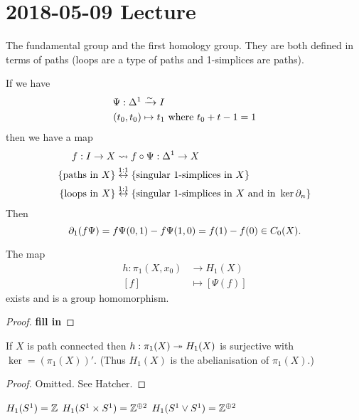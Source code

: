 \section{2018-05-09 Lecture}

The fundamental group and the first homology group.
They are both defined in terms of paths (loops are a type of paths and 1-simplices are paths).

If we have
\begin{align*}
  \Psi: \Delta^1 &\xrightarrow{\sim} I \\
  (t_0,t_0) &\mapsto t_1 \text{ where } t_0+t-1=1
\end{align*}
then we have a map
\begin{align*}
  f: I \to X &\leadsto f \circ \Psi: \Delta^1 \to X \\
  \{ \text{paths in } X\} &\overset{1:1}{\leftrightarrow} \{\text{singular 1-simplices in } X\} \\
  \{ \text{loops in } X\} &\overset{1:1}{\leftrightarrow} \{\text{singular 1-simplices in } X \text{ and in } \ker \partial_n \}
\end{align*}
Then
\[ \partial_1(f\Psi) = f\Psi(0,1) - f\Psi(1,0) = f(1)-f(0) \in C_0(X). \]

\begin{lem}
  The map
  \begin{align*}
    h: \pi_1(X,x_0) &\to H_1(X) \\
    [f] &\mapsto [\Psi(f)]
  \end{align*}
  exists and is a group homomorphism.
\end{lem}

\begin{proof}
  \textbf{fill in}
\end{proof}

\begin{thm}
  If $X$ is path connected then $h: \pi_1(X) \twoheadrightarrow H_1(X)$ is surjective with $\ker  = (\pi_1(X))'$.
  (Thus $H_1(X)$ is the abelianisation of $\pi_1(X)$.)
\end{thm}

\begin{proof}
  Omitted. See Hatcher.
\end{proof}

\begin{exam}
  \leavevmode
  \begin{enum}
    \io $H_1(S^1)=\mathbb{Z}$
    \io $H_1(S^1 \times S^1) = \mathbb{Z}^{\oplus 2}$
    \io $H_1(S^1 \vee S^1) = \mathbb{Z}^{\oplus 2}$
  \end{enum}
\end{exam}


